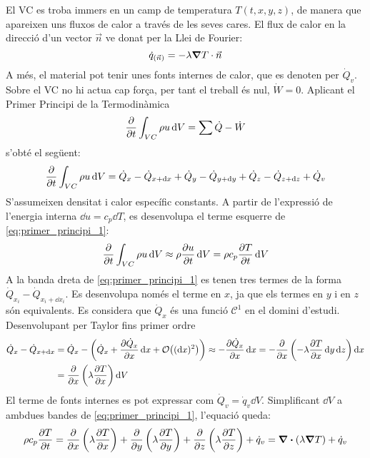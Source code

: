 \noindent
El VC es troba immers en un camp de temperatura $T(t, x, y, z)$, de manera que apareixen uns fluxos de calor a través de les seves cares. El flux de calor en la direcció d'un vector $\vec{n}$ ve donat per la Llei de Fourier:
\begin{equation}
	\dot{q}_{(\vec{n})} = -\lambda \grad{T} \cdot \vec{n}
\end{equation}
A més, el material pot tenir unes fonts internes de calor, que es denoten per $\dot{Q}_v$. Sobre el VC no hi actua cap força, per tant el treball és nul, $\dot{W} = 0$. Aplicant el Primer Principi de la Termodinàmica
\begin{equation} \label{eq:primer_principi_termodinamica_01}
	\pdv{t} \int_{VC} \rho u \dd{V} = \sum \dot{Q} - \dot{W}
\end{equation}
s'obté el següent:
\begin{equation} \label{eq:primer_principi_1}
	\pdv{t} \int_{VC} \rho u \dd{V} = 
	\dot{Q}_{x} - \dot{Q}_{x + \dd{x}} +
	\dot{Q}_{y} - \dot{Q}_{y + \dd{y}} +
	\dot{Q}_{z} - \dot{Q}_{z + \dd{z}} +
	\dot{Q}_v
\end{equation}
S'assumeixen densitat i calor específic constants. A partir de l'expressió de l'energia interna $\dd{u} = c_p \dd{T}$, es desenvolupa el terme esquerre de \eqref{eq:primer_principi_1}:
\begin{equation}
	\pdv{t} \int_{VC} \rho u \dd{V} \approx
	\rho \pdv{u}{t} \dd{V} = 
	\rho c_p \pdv{T}{t} \dd{V}
\end{equation}
A la banda dreta de \ref{eq:primer_principi_1} es tenen tres termes de la forma $\dot{Q}_{x_i} - \dot{Q}_{x_i + \dd{x_i}}$. Es desenvolupa només el terme en $x$, ja que els termes en $y$ i en $z$ són equivalents. Es considera que $\dot{Q}_x$ és una funció $\mathscr{C}^1$ en el domini d'estudi. Desenvolupant per Taylor fins primer ordre
\begin{align}	
	\dot{Q}_x - \dot{Q}_{x + \dd{x}}
	&= 
	\dot{Q}_x - \left( \dot{Q}_x + \pdv{\dot{Q}_x}{x} \dd{x} + \order{(\dd{x})^2} \right) \approx
	-\pdv{\dot{Q}_x}{x} \dd{x} = 
	-\pdv{x} \left( - \lambda \pdv{T}{x} \dd{y} \dd{z} \right) \dd{x} \nonumber \\ 
	&=\pdv{x} \left( \lambda \pdv{T}{x} \right) \dd{V}
\end{align}
El terme de fonts internes es pot expressar com $\dot{Q}_v = \dot{q}_v \dd{V}$. Simplificant $\dd{V}$ a ambdues bandes de \eqref{eq:primer_principi_1}, l'equació queda:
\begin{equation} \label{eq:edp_conduccio}
	\rho c_p \pdv{T}{t} = 
	\pdv{x} \left( \lambda \pdv{T}{x} \right) +
	\pdv{y} \left( \lambda \pdv{T}{y} \right) +
	\pdv{z} \left( \lambda \pdv{T}{z} \right) +
	\dot{q}_v = 
	\div{\left(\lambda \grad{T}\right)} + \dot{q}_v
\end{equation}


